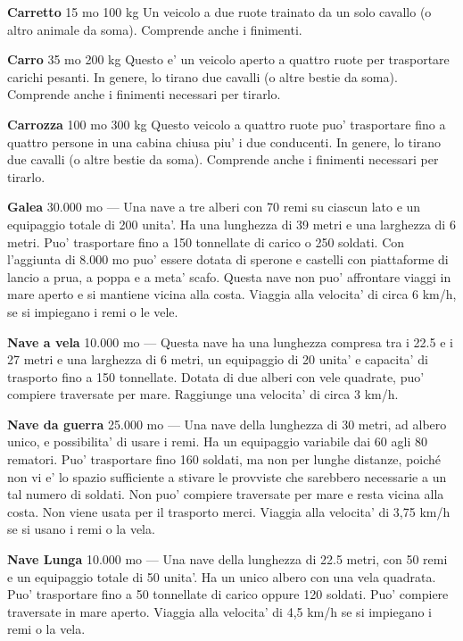 \documentclass[a4paper,11pt,twoside,openany]{book}
\begin{document}
{\textbf{Carretto} 15 mo 100 kg Un veicolo a due ruote trainato da un solo cavallo (o altro animale da soma). Comprende anche i finimenti.

\textbf{Carro} 35 mo 200 kg Questo e' un veicolo aperto a quattro ruote per trasportare carichi pesanti. In genere, lo tirano due cavalli (o altre bestie da soma). Comprende anche i finimenti necessari per tirarlo.

\textbf{Carrozza} 100 mo 300 kg Questo veicolo a quattro ruote puo' trasportare fino a quattro persone in una cabina chiusa piu' i due conducenti. In genere, lo tirano due cavalli (o altre bestie da soma). Comprende anche i finimenti necessari per tirarlo.

\textbf{Galea} 30.000 mo --- Una nave a tre alberi con 70 remi su ciascun lato e un equipaggio totale di 200 unita'. Ha una lunghezza di 39 metri e una larghezza di 6 metri. Puo' trasportare fino a 150 tonnellate di carico o 250 soldati. Con l'aggiunta di 8.000 mo puo' essere dotata di sperone e castelli con piattaforme di lancio a prua, a poppa e a meta' scafo. Questa nave non puo' affrontare viaggi in mare aperto e si mantiene vicina alla costa. Viaggia alla velocita' di circa 6 km/h, se si impiegano i remi o le vele.

\textbf{Nave a vela} 10.000 mo --- Questa nave ha una lunghezza compresa tra i 22.5 e i 27 metri e una larghezza di 6 metri, un equipaggio di 20 unita' e capacita' di trasporto fino a 150 tonnellate. Dotata di due alberi con vele quadrate, puo' compiere traversate per mare. Raggiunge una velocita' di circa 3 km/h. 

\textbf{Nave da guerra} 25.000 mo --- Una nave della lunghezza di 30 metri, ad albero unico, e possibilita' di usare i remi. Ha un equipaggio variabile dai 60 agli 80 rematori. Puo' trasportare fino 160 soldati, ma non per lunghe distanze, poiché non vi e' lo spazio sufficiente a stivare le provviste che sarebbero necessarie a un tal numero di soldati. Non puo' compiere traversate per mare e resta vicina alla costa. Non viene usata per il trasporto merci. Viaggia alla velocita' di 3,75 km/h se si usano i remi o la vela.

\textbf{Nave Lunga} 10.000 mo --- Una nave della lunghezza di 22.5 metri, con 50 remi e un equipaggio totale di 50 unita'. Ha un unico albero con una vela quadrata. Puo' trasportare fino a 50 tonnellate di carico oppure 120 soldati. Puo' compiere traversate in mare aperto. Viaggia alla velocita' di 4,5 km/h se si impiegano i remi o la vela.

}
\end{document}
